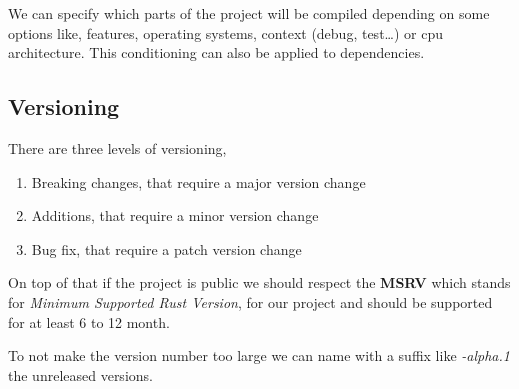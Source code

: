 We can specify which parts of the project will be compiled depending on some options like, features, operating systems, context (debug, test…) or cpu architecture.
This conditioning can also be applied to dependencies.

\subsection{Versioning}

There are three levels of versioning,

\begin{enumerate}
    \item Breaking changes, that require a major version change
    \item Additions, that require a minor version change
    \item Bug fix, that require a patch version change
\end{enumerate}

On top of that if the project is public we should respect the \textbf{MSRV} which stands for \textit{Minimum Supported Rust Version},
for our project and should be supported for at least 6  to 12 month.

To not make the version number too large we can name with a suffix like \textit{-alpha.1} the unreleased versions.